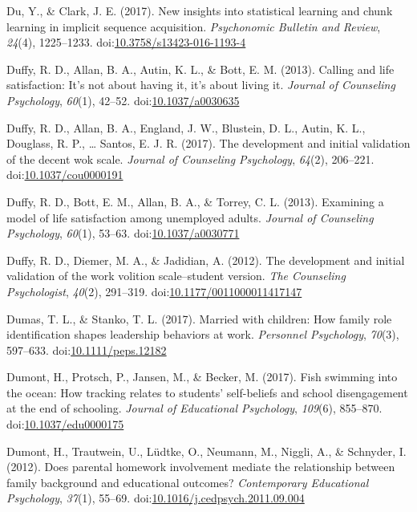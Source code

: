 \documentclass[english,man]{apa6}
\begin{document}
\hypertarget{ref-Du2016}{}
Du, Y., \& Clark, J. E. (2017). New insights into statistical learning
and chunk learning in implicit sequence acquisition. \emph{Psychonomic
Bulletin and Review}, \emph{24}(4), 1225--1233.
doi:\href{https://doi.org/10.3758/s13423-016-1193-4}{10.3758/s13423-016-1193-4}

\hypertarget{ref-Duffy2013a}{}
Duffy, R. D., Allan, B. A., Autin, K. L., \& Bott, E. M. (2013). Calling
and life satisfaction: It's not about having it, it's about living it.
\emph{Journal of Counseling Psychology}, \emph{60}(1), 42--52.
doi:\href{https://doi.org/10.1037/a0030635}{10.1037/a0030635}

\hypertarget{ref-Duffy2017}{}
Duffy, R. D., Allan, B. A., England, J. W., Blustein, D. L., Autin, K.
L., Douglass, R. P., \ldots{} Santos, E. J. R. (2017). The development
and initial validation of the decent wok scale. \emph{Journal of
Counseling Psychology}, \emph{64}(2), 206--221.
doi:\href{https://doi.org/10.1037/cou0000191}{10.1037/cou0000191}

\hypertarget{ref-Duffy2013}{}
Duffy, R. D., Bott, E. M., Allan, B. A., \& Torrey, C. L. (2013).
Examining a model of life satisfaction among unemployed adults.
\emph{Journal of Counseling Psychology}, \emph{60}(1), 53--63.
doi:\href{https://doi.org/10.1037/a0030771}{10.1037/a0030771}

\hypertarget{ref-Duffy2012}{}
Duffy, R. D., Diemer, M. A., \& Jadidian, A. (2012). The development and
initial validation of the work volition scale--student version.
\emph{The Counseling Psychologist}, \emph{40}(2), 291--319.
doi:\href{https://doi.org/10.1177/0011000011417147}{10.1177/0011000011417147}

\hypertarget{ref-Dumas2017}{}
Dumas, T. L., \& Stanko, T. L. (2017). Married with children: How family
role identification shapes leadership behaviors at work. \emph{Personnel
Psychology}, \emph{70}(3), 597--633.
doi:\href{https://doi.org/10.1111/peps.12182}{10.1111/peps.12182}

\hypertarget{ref-Dumont2017}{}
Dumont, H., Protsch, P., Jansen, M., \& Becker, M. (2017). Fish swimming
into the ocean: How tracking relates to students' self-beliefs and
school disengagement at the end of schooling. \emph{Journal of
Educational Psychology}, \emph{109}(6), 855--870.
doi:\href{https://doi.org/10.1037/edu0000175}{10.1037/edu0000175}

\hypertarget{ref-Dumont2012}{}
Dumont, H., Trautwein, U., Lüdtke, O., Neumann, M., Niggli, A., \&
Schnyder, I. (2012). Does parental homework involvement mediate the
relationship between family background and educational outcomes?
\emph{Contemporary Educational Psychology}, \emph{37}(1), 55--69.
doi:\href{https://doi.org/10.1016/j.cedpsych.2011.09.004}{10.1016/j.cedpsych.2011.09.004}
\end{document}
